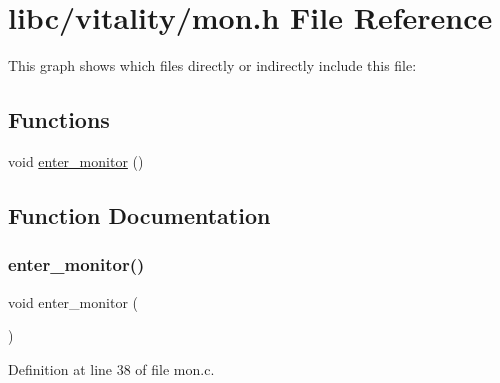 \hypertarget{a00176}{}\section{libc/vitality/mon.h File Reference}
\label{a00176}
This graph shows which files directly or indirectly include this file\+:
\subsection*{Functions}
\begin{DoxyCompactItemize}
\item 
void \hyperlink{a00176_a33b77c779213ba5f7a0381c995a06f62_a33b77c779213ba5f7a0381c995a06f62}{enter\+\_\+monitor} ()
\end{DoxyCompactItemize}


\subsection{Function Documentation}
\mbox{\label{a00176_a33b77c779213ba5f7a0381c995a06f62_a33b77c779213ba5f7a0381c995a06f62}} 
\subsubsection{\texorpdfstring{enter\+\_\+monitor()}{enter\_monitor()}}
{\footnotesize\ttfamily void enter\+\_\+monitor (\begin{DoxyParamCaption}{ }\end{DoxyParamCaption})}



Definition at line 38 of file mon.\+c.


